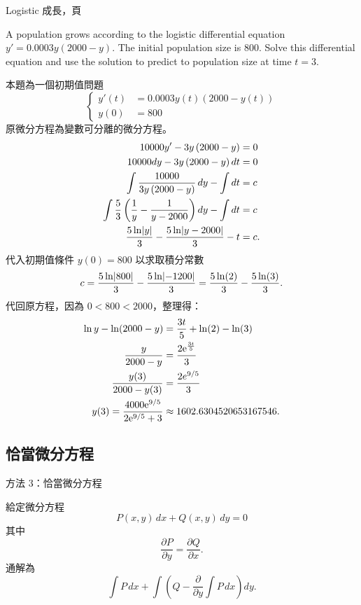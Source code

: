 \documentclass{beamer}
\newcommand{\Left} {\mathopen{}\mathclose\bgroup\left}
\newcommand{\Right}{\aftergroup\egroup\right}
\newcommand  {\e}{\textup e}
\theoremstyle{remark}
\begin{document}
\begin{CJK}{UTF8}{bsmi}
\begin{frame}[allowframebreaks]{Logistic 成長，頁}
  \begin{example}
    A population grows according to the logistic differential equation $y' = 0.0003y \left( 2000-y \right)$. The initial
    population size is 800. Solve this differential equation and use the solution to predict to population size at time
    $t=3$.
  \end{example}
  本題為一個初期值問題
  \[\left\{ \begin{aligned}
      y'(t) &= 0.0003y(t) \left( 2000-y(t) \right)\\
      y(0)  &= 800
    \end{aligned} \right.\]
  原微分方程為變數可分離的微分方程。
  \begin{align*}
    10000y' - 3y \left( 2000 - y \right) &= 0\\
    10000dy - 3y \left( 2000 - y \right) dt &= 0\\
    \int \frac{10000}{3y \left( 2000 - y \right)}\,dy - \int dt &= c\\
    \int \frac53 \left( \frac1y - \frac{1}{y-2000} \right) dy - \int dt &= c\\
    \frac{5 \ln \Left| y \Right|}{3} - \frac{5 \ln \Left| y - 2000 \Right|}{3} - t &= c.
  \end{align*}
  代入初期值條件 $y(0) = 800$ 以求取積分常數
  \[c = \frac{5 \ln \Left| 800 \Right|}{3} - \frac{5 \ln \Left| -1200 \Right|}{3} = \frac{5\ln(2)}{3} - \frac{5\ln(3)}{3}.\]
  代回原方程，因為 $0 < 800 < 2000$，整理得：
  \begin{align*}
    \ln y - \ln \Left( 2000 - y \Right) &= \frac{3t}{5} + \ln(2) - \ln(3)\\
    \frac{y}{2000-y} &= \frac{2\e^\frac{3t}{5}}{3}\\
    \frac{y(3)}{2000-y(3)} &= \frac{2e^{9/5}}{3}\\
    y(3) = \frac{4000\e^{9/5}}{2\e^{9/5}+3} &\approx 1602.6304520653167546.
  \end{align*}
\end{frame}

\subsection[恰當--積分乘數]{恰當微分方程}
\begin{frame}{方法 3：恰當微分方程}
  \begin{theorem}
    給定微分方程
    \[P(x,y)\,dx + Q(x,y)\,dy = 0\]
    其中
    \begin{equation}
      \frac{\partial P}{\partial y} = \frac{\partial Q}{\partial x}. \label{eq:Exact}
    \end{equation}
    通解為
    \[\int P\,dx + \int \left( Q - \frac{\partial}{\partial y} \int P\,dx \right) dy.\]
  \end{theorem}
\end{frame}


\end{CJK}
\end{document}
